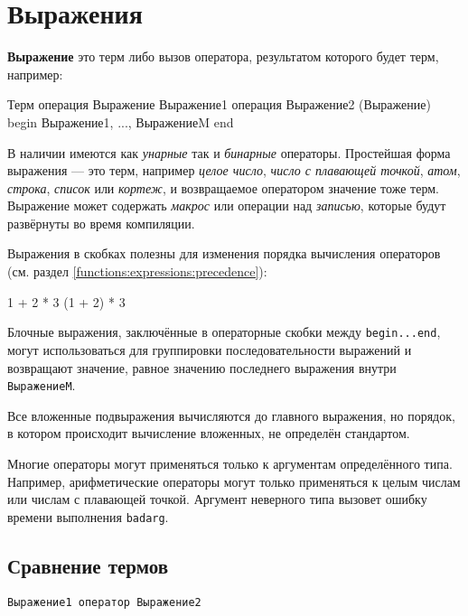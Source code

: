 \section{Выражения}
\label{functions:expressions}

\textbf{Выражение} это терм либо вызов оператора, результатом которого будет 
терм, например:

\begin{erlangru}
Терм
операция Выражение
Выражение1 операция Выражение2
(Выражение)
begin
   Выражение1,
   ...,
   ВыражениеM            %
end
\end{erlangru}

В наличии имеются как \emph{унарные} так и \emph{бинарные} операторы. Простейшая
форма выражения --- это терм, например \emph{целое число}, \emph{число с 
плавающей точкой}, \emph{атом}, \emph{строка}, \emph{список} или \emph{кортеж},
и возвращаемое оператором значение тоже терм. Выражение может содержать
\emph{макрос} или операции над \emph{записью}, которые будут развёрнуты во
время компиляции.

Выражения в скобках полезны для изменения порядка вычисления операторов (см.  
раздел \ref{functions:expressions:precedence}):

\begin{erlang}
1 + 2 * 3           %
(1 + 2) * 3         %
\end{erlang}

Блочные выражения, заключённые в операторные скобки между \texttt{begin...end},
могут использоваться для группировки последовательности выражений и возвращают 
значение, равное значению последнего выражения внутри \texttt{ВыражениеM}.

Все вложенные подвыражения вычисляются до главного выражения, но порядок, в 
котором происходит вычисление вложенных, не определён стандартом.

Многие операторы могут применяться только к аргументам определённого типа. 
Например, арифметические операторы могут только применяться к целым числам или 
числам с плавающей точкой. Аргумент неверного типа вызовет ошибку времени 
выполнения \texttt{badarg}.


\subsection{Сравнение термов}

\begin{verbatim}
Выражение1 оператор Выражение2
\end{verbatim}

